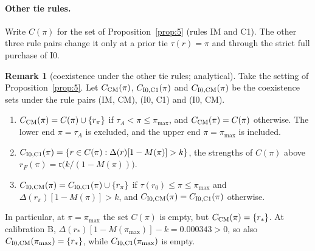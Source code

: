 \documentclass[11pt]{article}
\theoremstyle{definition}
\newtheorem{remark}{Remark}
\newcommand{\fr}{\mathfrak r}
\begin{document}
\paragraph{Other tie rules.} Write $C(\pi)$ for the set of Proposition~\ref{prop:5} (rules IM and C1). The other
three rule pairs change it only at a prior tie $\tau(r)=\pi$ and through the strict full purchase of I0.

\begin{remark}[coexistence under the other tie rules; analytical]\label{rem:ties}
Take the setting of Proposition~\ref{prop:5}. Let $C_{\rm CM}(\pi)$, $C_{\rm I0,C1}(\pi)$ and $C_{\rm I0,CM}(\pi)$ be
the coexistence sets under the rule pairs (IM, CM), (I0, C1) and (I0, CM).
\begin{enumerate}[label=(\alph*)]
\item $C_{\rm CM}(\pi)=C(\pi)\cup\{r_\pi\}$ if $\tau_A<\pi\le\pi_{\max}$, and $C_{\rm CM}(\pi)=C(\pi)$ otherwise. The
  lower end $\pi=\tau_A$ is excluded, and the upper end $\pi=\pi_{\max}$ is included.
\item $C_{\rm I0,C1}(\pi)=\{r\in C(\pi):\Delta(r)[1-M(\pi)]>k\}$, the strengths of $C(\pi)$ above
  $r_F(\pi)=\fr\big(k/(1-M(\pi))\big)$.
\item $C_{\rm I0,CM}(\pi)=C_{\rm I0,C1}(\pi)\cup\{r_\pi\}$ if $\tau(r_0)\le\pi\le\pi_{\max}$ and
  $\Delta(r_\pi)[1-M(\pi)]>k$, and $C_{\rm I0,CM}(\pi)=C_{\rm I0,C1}(\pi)$ otherwise.
\end{enumerate}
In particular, at $\pi=\pi_{\max}$ the set $C(\pi)$ is empty, but $C_{\rm CM}(\pi)=\{r_*\}$. At calibration B,
$\Delta(r_*)[1-M(\pi_{\max})]-k=0.000343>0$, so also $C_{\rm I0,CM}(\pi_{\max})=\{r_*\}$, while
$C_{\rm I0,C1}(\pi_{\max})$ is empty.
\end{remark}
\end{document}
